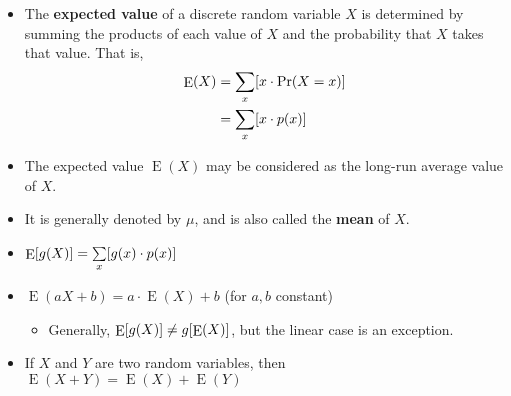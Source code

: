 \documentclass[12pt,a4paper,titlepage]{article}
\DeclareMathOperator{\E}{E}
\DeclarePairedDelimiter {\bracs} {  [      }     {  ]      }
\begin{document}
            \begin{SummaryBox}[title=Population parameters, breakable]
                \begin{SummaryExtensionBox}[title=Expected value]
                    \begin{itemize}[leftmargin=*]
                        \item The \textbf{expected value} of a discrete random variable $X$ is determined by summing the products of each value of $X$ and the probability that $X$ takes that value. That is,
                        \begin{align*}
                            \E(X) &= \sum\limits_x \bracs*{ x \cdot \Pr(X = x) } \\
                                  &= \sum\limits_x \bracs*{ x \cdot p(x) }
                        \end{align*}
                        \item The expected value $\E(X)$ may be considered as the long-run average value of $X$.
                        \item It is generally denoted by $\mu$, and is also called the \textbf{mean} of $X$.
                        \item $\E\bracs*{g(X)} = \sum\limits_x \bracs*{ g(x) \cdot p(x) }$
                        \item $\E(aX + b) = a \cdot \E(X) + b$ \quad (for $a,b$ constant)
                        \begin{itemize}[topsep=0pt]
                            \item Generally, $\E\bracs*{ g(X) } \neq g\bracs*{ \E(X) }$, but the linear case is an exception.
                        \end{itemize}
                        \item If $X$ and $Y$ are two random variables, then $\E(X+Y) = \E(X) + \E(Y)$
                    \end{itemize}
                \end{SummaryExtensionBox}
                

\end{SummaryBox}
\end{document}
